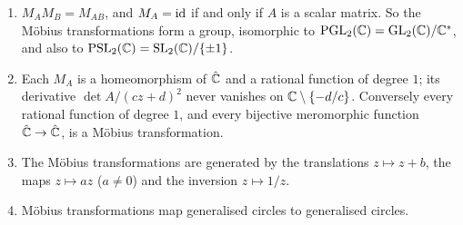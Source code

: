 \begin{proposition}\label{complex-analysis:proposition-mobius}
\begin{enumerate}
\item $M_AM_B = M_{AB}$, and $M_A = \mathrm{id}$ if and only if $A$ is a scalar matrix. So the M\"obius transformations form a group, isomorphic to $\mathrm{PGL}_2(\mathbb{C}) = \mathrm{GL}_2(\mathbb{C})/\mathbb{C}^*$, and also to
$\mathrm{PSL}_2(\mathbb{C}) = \mathrm{SL}_2(\mathbb{C})/\{\pm1\}$.
\item Each $M_A$ is a homeomorphism of $\hat{\mathbb{C}}$ and a rational function of degree $1$; its derivative $\det A/(cz + d)^2$ never vanishes on $\mathbb{C} \setminus \{-d/c\}$. Conversely every rational function of degree $1$, and
every bijective meromorphic function $\hat{\mathbb{C}} \to \hat{\mathbb{C}}$, is a M\"obius transformation.
\item The M\"obius transformations are generated by the translations $z \mapsto z + b$, the maps $z \mapsto az$ ($a \neq 0$) and the inversion $z \mapsto 1/z$.
\item M\"obius transformations map generalised circles to generalised circles.
\end{enumerate}
\end{proposition}

